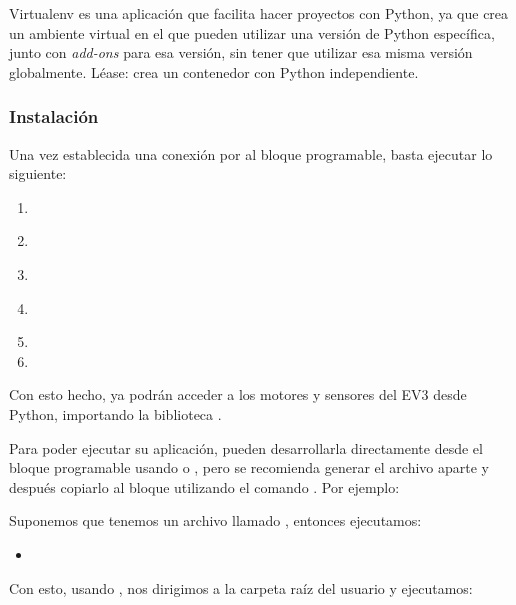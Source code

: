 Virtualenv es una aplicación que facilita hacer proyectos con Python, ya que crea un ambiente virtual en el que pueden utilizar una versión de Python específica, junto con \textit{add-ons} para esa versión, sin tener que utilizar esa misma versión globalmente. Léase: crea un contenedor con Python independiente.

\subsubsection{Instalación}
Una vez establecida una conexión por  al bloque programable, basta ejecutar lo siguiente:

\begin{enumerate}
  \item {}
  \item {}\\ 
  \item {}
  \item {}\\ 
  \item {}
  \item {}
\end{enumerate}

Con esto hecho, ya podrán acceder a los motores y sensores del EV3 desde Python, importando la biblioteca .\par

Para poder ejecutar su aplicación, pueden desarrollarla directamente desde el bloque programable usando  o , pero se recomienda generar el archivo aparte y después copiarlo al bloque utilizando el comando . Por ejemplo:

Suponemos que tenemos un archivo llamado , entonces ejecutamos:

\begin{itemize}
 \item {}
\end{itemize}

Con esto, usando , nos dirigimos a la carpeta raíz del usuario y ejecutamos:

